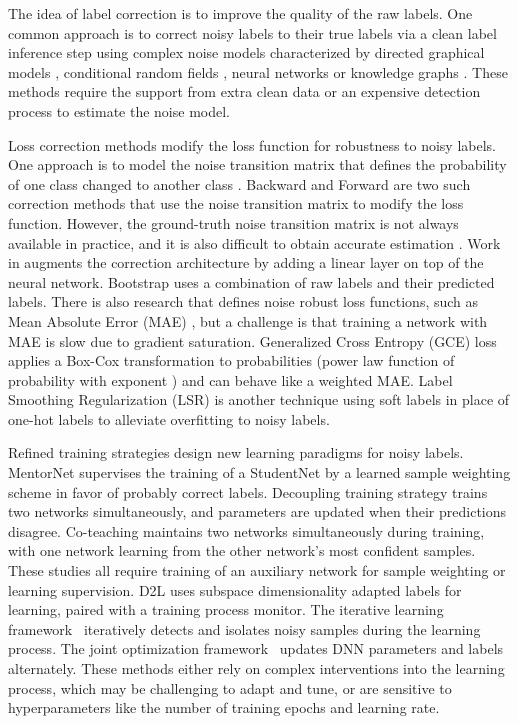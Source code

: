 \documentclass[10pt,twocolumn,letterpaper]{article}
\begin{document}
The idea of label correction is to improve the quality of the raw labels. One common approach is to correct noisy labels to their true labels via a clean label inference step using complex noise models characterized by directed graphical models \cite{xiao2015learning}, conditional random fields \cite{vahdat2017toward}, neural networks \cite{lee2017cleannet,veit2017learning} or knowledge graphs \cite{li2017learning}. These methods require the support from extra clean data or an expensive detection process to estimate the noise model. 


Loss correction methods modify the loss function for robustness to noisy labels. One approach is to model the noise transition matrix that defines the probability of one class changed to another class \cite{han2018masking}. Backward \cite{patrini2017making} and Forward \cite{patrini2017making} are two such correction methods that use the noise transition matrix to modify the loss function. However, the ground-truth noise transition matrix is not always available in practice, and it is also difficult to obtain accurate estimation \cite{han2018masking}. Work in \cite{goldberger2016training,sukhbaatar2014training} augments the correction architecture by adding a linear layer on top of the neural network. Bootstrap \cite{reed2014training}  uses a combination of raw labels and their predicted labels. There is also research that defines noise robust loss functions, such as Mean Absolute Error (MAE) \cite{ghosh2017robust}, but a challenge is that training a network with MAE is slow due to gradient saturation.    Generalized Cross Entropy (GCE) loss \cite{zhang2018generalized} applies a Box-Cox transformation to probabilities (power law function of probability with exponent ) and can behave like a weighted MAE. Label Smoothing Regularization (LSR) \cite{szegedy2016rethinking,pereyra2017regularizing} is another technique using soft labels in place of one-hot labels to alleviate overfitting to noisy labels. 


Refined training strategies design new learning paradigms for noisy labels. MentorNet \cite{jiang2018mentornet,yu2019does} supervises the training of a StudentNet by a learned sample weighting scheme in favor of probably correct labels. Decoupling training strategy \cite{malach2017decoupling} trains two networks simultaneously, and parameters are updated when their predictions disagree. Co-teaching \cite{han2018co} maintains two networks simultaneously during training, with one network learning from the other network's most confident samples. These studies all require training of an auxiliary network for sample weighting or learning supervision. D2L \cite{ma2018dimensionality} uses subspace dimensionality adapted labels for learning, paired with a training process monitor. The iterative learning framework~\cite{wang2018iterative} iteratively detects and isolates noisy samples during the learning process. The joint optimization framework~\cite{tanaka2018joint} updates DNN parameters and labels alternately. These methods either rely on complex interventions into the learning process, which may be challenging to adapt and tune, or are sensitive to hyperparameters like the number of training epochs and learning rate.
\end{document}
